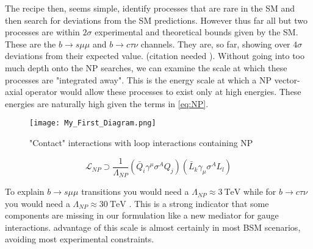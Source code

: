 The recipe then, seems simple, identify processes that are rare in the SM and then search for deviations from the SM predictions. However\Joaoadd{,} thus far\Joaoadd{,} all but two processes are within $2\sigma$ experimental and theoretical bounds given by the SM. 
%
These are the $b \rightarrow s \mu \mu$ and $b \rightarrow c \tau \nu$ channels. They are, so far, showing over $ 4 \sigma$ deviations from  their expected value. {\color{blue} (citation needed )}.
%
Without going into too much depth onto the NP searches, we can examine the scale at which these processes are "integrated away". This is the energy scale at which a NP vector-axial operator would allow these processes to exist only at high energies. These energies are naturally high given the terms in \eqref{eq:NP}. 
%
\bigbreak
%
\noindent\begin{minipage}{.3\textwidth}
	\begin{figure}[H]
		\label{fig:contactNP}
		\centering
		\texttt{[image: My\_First\_Diagram.png]}
		\caption{"Contact" interactions with loop interactions containing NP}
	\end{figure}
\end{minipage}
\begin{minipage}{.6\textwidth}
\begin{equation}
\label{eq:NP}
\mathcal{L}_{NP} \supset \frac{1}{\Lambda_{NP}} (\bar{Q}_i \gamma^\mu \sigma^A Q_j ) (\bar{L}_k \gamma_\mu \sigma^A L_l) 
\end{equation}
\end{minipage}
%
\bigbreak
%
 To explain $b \rightarrow s \mu \mu$ transitions you would need a $\Lambda_{NP} \approx 3 \ \text{TeV}$ while for $b \rightarrow c \tau \nu$ you would need a $\Lambda_{NP} \approx 30\ \text{TeV}$ . This is a strong indicator that some components are missing in our formulation like a new mediator for gauge interactions.  advantage of this scale is  almost certainly in most BSM scenarios, avoiding most experimental constraints.

